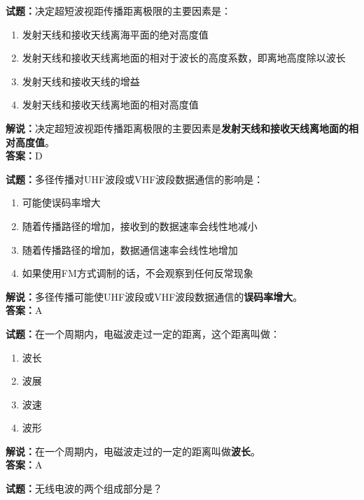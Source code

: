 \documentclass{ctexbook}
\begin{document}
\bigskip

\noindent\textbf{试题：}决定超短波视距传播距离极限的主要因素是：

\begin{enumerate}[leftmargin=3em]
  \item 发射天线和接收天线离海平面的绝对高度值
  \item 发射天线和接收天线离地面的相对于波长的高度系数，即离地高度除以波长
  \item 发射天线和接收天线的增益
  \item 发射天线和接收天线离地面的相对高度值
\end{enumerate}

\noindent\textbf{解说：}决定超短波视距传播距离极限的主要因素是\textbf{发射天线和接收天线离地面的相对高度值}。\\\noindent\textbf{答案：}D

\bigskip

\noindent\textbf{试题：}多径传播对UHF波段或VHF波段数据通信的影响是：

\begin{enumerate}[leftmargin=3em]
  \item 可能使误码率增大
  \item 随着传播路径的增加，接收到的数据速率会线性地减小
  \item 随着传播路径的增加，数据通信速率会线性地增加
  \item 如果使用FM方式调制的话，不会观察到任何反常现象
\end{enumerate}

\noindent\textbf{解说：}多径传播可能使UHF波段或VHF波段数据通信的\textbf{误码率增大}。\\\noindent\textbf{答案：}A

\bigskip

\noindent\textbf{试题：}在一个周期内，电磁波走过一定的距离，这个距离叫做：

\begin{enumerate}[leftmargin=3em]
  \item 波长
  \item 波展
  \item 波速
  \item 波形
\end{enumerate}

\noindent\textbf{解说：}在一个周期内，电磁波走过的一定的距离叫做\textbf{波长}。\\\noindent\textbf{答案：}A

\bigskip

\noindent\textbf{试题：}无线电波的两个组成部分是？
\end{document}
